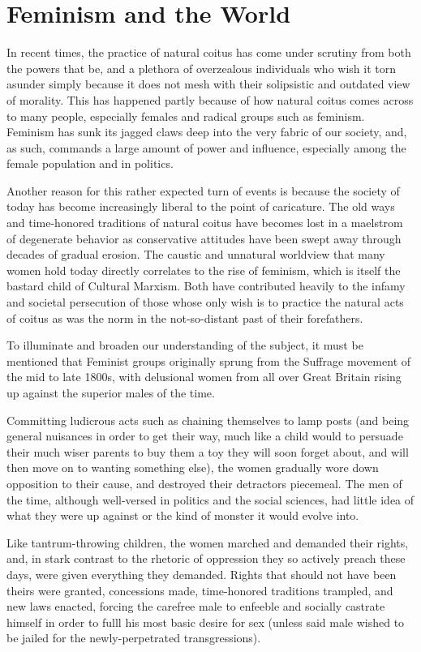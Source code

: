 \section*{Feminism and the World}

In recent times, the practice of natural coitus has come under scrutiny from both the powers that be, and a plethora of overzealous individuals who wish it torn asunder simply because it does not mesh with their solipsistic and outdated view of morality. This has happened partly because of how natural coitus comes across to many people, especially females and radical groups such as feminism. Feminism has sunk its jagged claws deep into the very fabric of our society, and, as such, commands a large amount of power and influence, especially among the female population and in politics.


Another reason for this rather expected turn of events is because the society of today has
become increasingly liberal to the point of caricature. The old ways and time-honored traditions
of natural coitus have becomes lost in a maelstrom of degenerate behavior as conservative
attitudes have been swept away through decades of gradual erosion. The caustic and unnatural
worldview that many women hold today directly correlates to the rise of feminism, which is itself
the bastard child of Cultural Marxism. Both have contributed heavily to the infamy and societal
persecution of those whose only wish is to practice the natural acts of coitus as was the norm in
the not-so-distant past of their forefathers. 


To illuminate and broaden our understanding of the subject, it must be mentioned that Feminist groups originally sprung from the Suffrage movement of the mid to late 1800s, with delusional women from all over Great Britain rising up against the superior males of the time.


Committing ludicrous acts such as chaining themselves to lamp posts (and being general nuisances in order to get their way, much like a child would to persuade their much wiser parents to buy them a toy they will soon forget about, and will then move on to wanting something else), the women gradually wore down opposition to their cause, and destroyed their detractors piecemeal. The men of the time, although well-versed in politics and the social sciences, had little idea of what they were up against or the kind of monster it would evolve into.


Like tantrum-throwing children, the women marched and demanded their rights, and, in stark contrast to the rhetoric of oppression they so actively preach these days, were given everything they demanded. Rights that should not have been theirs were granted, concessions made, time-honored traditions trampled, and new laws enacted, forcing the carefree male to enfeeble and socially castrate himself in order to fulll his most basic desire for sex (unless said male wished to be jailed for the newly-perpetrated transgressions). 


